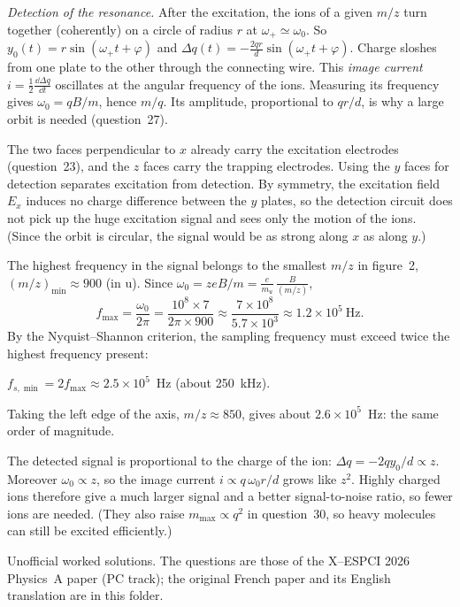 \documentclass[11pt,a4paper]{article}
\begin{document}
\emph{Detection of the resonance.} After the excitation, the ions of a given $m/z$ turn
together (coherently) on a circle of radius $r$ at $\omega_+\simeq\omega_0$. So
$y_0(t) = r\sin(\omega_+t+\varphi)$ and $\Delta q(t) = -\frac{2qr}{d}\sin(\omega_+t+\varphi)$.
Charge sloshes from one plate to the other through the connecting wire. This \emph{image
current} $i = \frac12\frac{\dd\Delta q}{\dd t}$ oscillates at the angular frequency of the ions.
Measuring its frequency gives $\omega_0 = qB/m$, hence $m/q$. Its amplitude, proportional to
$qr/d$, is why a large orbit is needed (question~27).

The two faces perpendicular to $x$ already carry the excitation electrodes (question~23), and
the $z$ faces carry the trapping electrodes. Using the $y$ faces for detection separates
excitation from detection. By symmetry, the excitation field $E_x$ induces no charge
difference between the $y$ plates, so the detection circuit does not pick up the huge
excitation signal and sees only the motion of the ions. (Since the orbit is circular, the
signal would be as strong along $x$ as along $y$.)

The highest frequency in the signal belongs to the smallest $m/z$ in figure~2,
$(m/z)_{\min}\approx900$ (in u). Since $\omega_0 = zeB/m = \frac{e}{m_u}\,\frac{B}{(m/z)}$,
\[
  f_{\max} = \frac{\omega_0}{2\pi} = \frac{10^8\times7}{2\pi\times900}\approx\frac{7\times10^8}{5.7\times10^3}
  \approx1.2\times10^5\ \mathrm{Hz}.
\]
By the Nyquist--Shannon criterion, the sampling frequency must exceed twice the highest
frequency present:
\begin{result}
$f_{s,\min} = 2f_{\max}\approx2.5\times10^5$~Hz (about 250~kHz).
\end{result}
Taking the left edge of the axis, $m/z\approx850$, gives about $2.6\times10^5$~Hz: the same
order of magnitude.

The detected signal is proportional to the charge of the ion: $\Delta q = -2qy_0/d\propto z$.
Moreover $\omega_0\propto z$, so the image current $i\propto q\,\omega_0r/d$ grows like $z^2$.
Highly charged ions therefore give a much larger signal and a better signal-to-noise ratio, so
fewer ions are needed. (They also raise $m_{\max}\propto q^2$ in question~30, so heavy
molecules can still be excited efficiently.)

\par\vspace{8mm}
\begin{center}\small\color{black!55}
Unofficial worked solutions. The questions are those of the X--ESPCI 2026 Physics~A paper
(PC track); the original French paper and its English translation are in this folder.
\end{center}
\end{document}
